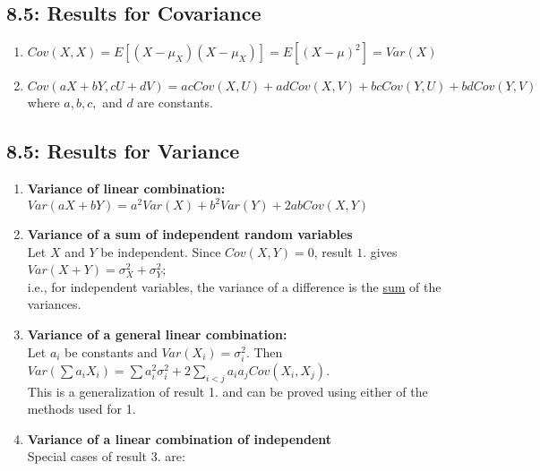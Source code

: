 \documentclass[11pt]{article}
\begin{document}
     
     \subsection*{8.5: Results for Covariance}
     	\begin{enumerate}
     		\item $Cov(X,X) = E[(X-\mu_X)(X-\mu_X)]=E[(X-\mu)^2]=Var(X)$
     		\item $Cov(aX+bY,cU+dV)=acCov(X,U)+adCov(X,V)+bcCov(Y,U)+bdCov(Y,V)$ where $a,b,c,$ and $d$ are constants.
     	\end{enumerate}
     
     \subsection*{8.5: Results for Variance}
     	\begin{enumerate}
     		\item {\bf Variance of linear combination:}\\
     		$Var(aX+bY)=a^2Var(X)+b^2Var(Y)+2abCov(X,Y)$
     		\item {\bf Variance of a sum of independent random variables}\\
     		Let $X$ and $Y$ be independent. Since $Cov(X,Y)=0$, result $1$. gives\\
     		$Var(X+Y)=\sigma^2_X+\sigma^2_Y$;\\
     		i.e., for independent variables, the variance of a difference is the \underline{sum} of the variances.\\
     		\item {\bf Variance of a general linear combination:}\\
     			Let $a_i$ be constants and $Var(X_i)=\sigma^2_i$. Then \\
     			$Var(\sum a_i X_i)=\sum a_i^2 \sigma_i^2 +2\sum_{i<j} a_ia_j Cov(X_i,X_j)	$.\\
   This is a generalization of result 1. and can be proved using either of the methods used for 1.\\
     			\item {\bf Variance of  a linear combination of independent}\\
     			Special cases of result 3. are:
     	
     	\end{enumerate}
     	
\end{document}
